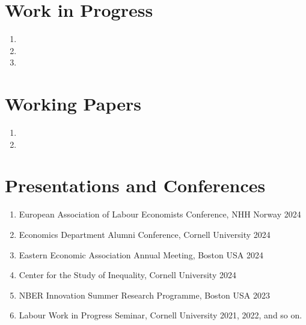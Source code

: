 \documentclass[letterpaper,11pt,oneside]{article}
\begin{document}
\section*{Work in Progress}
\begin{enumerate}[itemsep=2.5pt, label={}]
    \item {}
    \item {}
    \item {}
\end{enumerate}


\section*{Working Papers}
\begin{enumerate}[itemsep=2.5pt, label={}]
    \item {}
    \item {}
\end{enumerate}


\section*{Presentations and Conferences}
\begin{enumerate}[itemsep=2pt, label={}]
    \item European Association of Labour Economists Conference, NHH Norway \hfill
    2024
    \item Economics Department Alumni Conference, Cornell University \hfill 2024
    \item Eastern Economic Association Annual Meeting, Boston USA \hfill 2024
    \item Center for the Study of Inequality, Cornell University \hfill 2024
    \item NBER Innovation Summer Research Programme, Boston USA \hfill 2023
    \item Labour Work in Progress Seminar, Cornell University \hfill 2021, 2022, and so on.
\end{enumerate}
\end{document}
